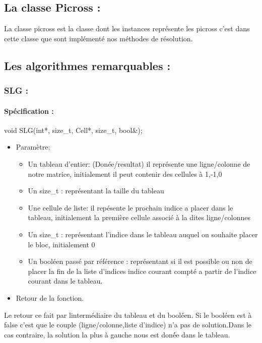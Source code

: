 \documentclass{article}
\begin{document}
\subsection{ La classe Picross :}
La classe picross est la classe dont les instances repr\'esente les picross c'est dans cette classe que sont impl\'ement\'e nos m\'ethodes de r\'esolution.
\subsection{Les algorithmes remarquables :}
\subsubsection{SLG :}
\paragraph{Sp\'ecification :}
 void SLG(int*, size\_t, Cell*, size\_t, bool\&);
\begin{itemize}
\item Param\`etre:
\begin{itemize}
\item Un tableau d'entier: (Donée/resultat) il repr\'esente une ligne/colonne de notre matrice, initialement il peut contenir des cellules \`a 1,-1,0
\item Un size\_t : repr\'esentant la taille du tableau
\item Une cellule de liste: il rep\'esente le prochain indice a placer dans le tableau, initialement la premi\`ere cellule associ\'e \`a la dites ligne/colonnes
\item Un size\_t : repr\'esentant l'indice dans le tableau auquel on souhaite placer le bloc, initialement 0
\item Un bool\'een passé par r\'ef\'erence : représentant si il est possible ou non de placer la fin de la liste d'indices indice courant compt\'e a partir de l'indice courant dans le tableau.
\end{itemize}
\item Retour de la fonction.
\end{itemize}
Le retour ce fait par linterm\'ediaire du tableau  et du bool\'een. Si le bool\'een est \`a false c'est que le couple (ligne/colonne,liste d'indice) n'a pas de solution.Dans le cas contraire, la solution la plus \`a gauche nous est don\'ée dans le tableau.
\end{document}
